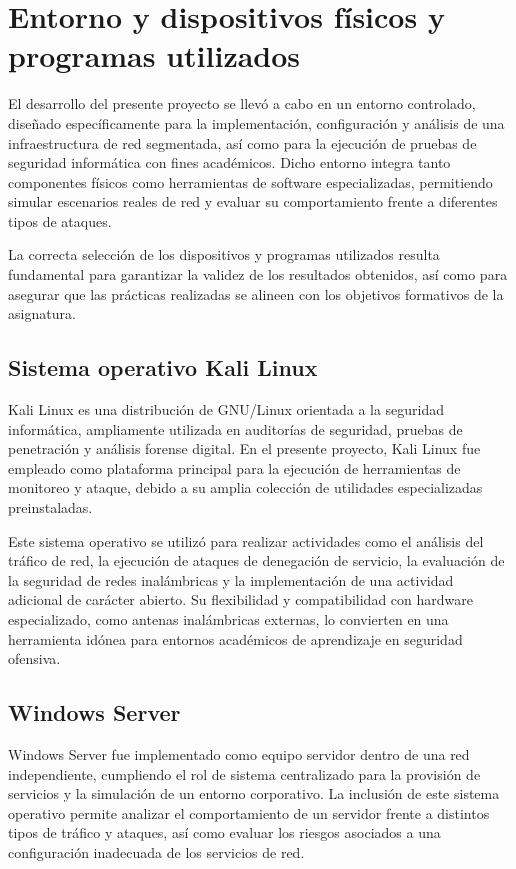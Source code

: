 \section{Entorno y dispositivos físicos y programas utilizados}

El desarrollo del presente proyecto se llevó a cabo en un entorno controlado, diseñado específicamente para la implementación, configuración y análisis de una infraestructura de red segmentada, así como para la ejecución de pruebas de seguridad informática con fines académicos. Dicho entorno integra tanto componentes físicos como herramientas de software especializadas, permitiendo simular escenarios reales de red y evaluar su comportamiento frente a diferentes tipos de ataques.

La correcta selección de los dispositivos y programas utilizados resulta fundamental para garantizar la validez de los resultados obtenidos, así como para asegurar que las prácticas realizadas se alineen con los objetivos formativos de la asignatura.

\subsection{Sistema operativo Kali Linux}

Kali Linux es una distribución de GNU/Linux orientada a la seguridad informática, ampliamente utilizada en auditorías de seguridad, pruebas de penetración y análisis forense digital. En el presente proyecto, Kali Linux fue empleado como plataforma principal para la ejecución de herramientas de monitoreo y ataque, debido a su amplia colección de utilidades especializadas preinstaladas.

Este sistema operativo se utilizó para realizar actividades como el análisis del tráfico de red, la ejecución de ataques de denegación de servicio, la evaluación de la seguridad de redes inalámbricas y la implementación de una actividad adicional de carácter abierto. Su flexibilidad y compatibilidad con hardware especializado, como antenas inalámbricas externas, lo convierten en una herramienta idónea para entornos académicos de aprendizaje en seguridad ofensiva.

\subsection{Windows Server}

Windows Server fue implementado como equipo servidor dentro de una red independiente, cumpliendo el rol de sistema centralizado para la provisión de servicios y la simulación de un entorno corporativo. La inclusión de este sistema operativo permite analizar el comportamiento de un servidor frente a distintos tipos de tráfico y ataques, así como evaluar los riesgos asociados a una configuración inadecuada de los servicios de red.

